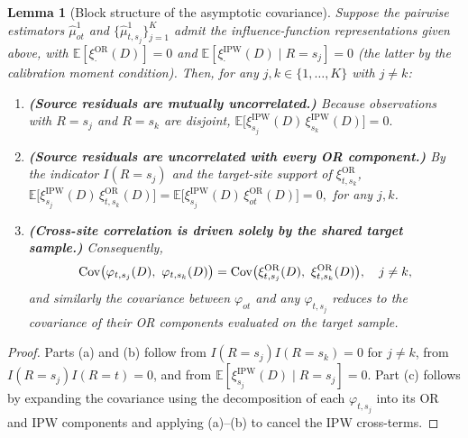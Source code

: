 \documentclass{article}
\newtheorem{lemma}[theorem]{Lemma}
\begin{document}
\begin{lemma}[Block structure of the asymptotic covariance]\label{lem:cov_block_structure}
Suppose the pairwise estimators $\widehat{\mu}^1_{ot}$ and $\{\widehat{\mu}^1_{t,s_j}\}_{j=1}^K$ admit the influence-function representations given above, with $\mathbb{E}[\xi^{\mathrm{OR}}_{\cdot}(D)]=0$ and $\mathbb{E}[\xi^{\mathrm{IPW}}_{\cdot}(D)\mid R=s_j]=0$ (the latter by the calibration moment condition). Then, for any $j,k\in\{1,\ldots,K\}$ with $j\ne k$:
\begin{enumerate}[label={(\alph*)},leftmargin=*]
\item \textbf{(Source residuals are mutually uncorrelated.)} Because observations with $R=s_j$ and $R=s_k$ are disjoint,
\(
\mathbb{E}\bigl[\xi^{\mathrm{IPW}}_{s_j}(D)\,\xi^{\mathrm{IPW}}_{s_k}(D)\bigr]=0.
\)

\item \textbf{(Source residuals are uncorrelated with every OR component.)} By the indicator $I(R=s_j)$ and the target-site support of $\xi^{\mathrm{OR}}_{t,s_k}$,
\(
\mathbb{E}\bigl[\xi^{\mathrm{IPW}}_{s_j}(D)\,\xi^{\mathrm{OR}}_{t,s_k}(D)\bigr]
=\mathbb{E}\bigl[\xi^{\mathrm{IPW}}_{s_j}(D)\,\xi^{\mathrm{OR}}_{ot}(D)\bigr]=0,
\)
for any $j,k$.

\item \textbf{(Cross-site correlation is driven solely by the shared target sample.)} Consequently,
\[
\Cov\bigl(\varphi_{t,s_j}(D),\ \varphi_{t,s_k}(D)\bigr)
=\Cov\bigl(\xi^{\mathrm{OR}}_{t,s_j}(D),\ \xi^{\mathrm{OR}}_{t,s_k}(D)\bigr),
\quad j\ne k,
\]
and similarly the covariance between $\varphi_{ot}$ and any $\varphi_{t,s_j}$ reduces to the covariance of their OR components evaluated on the target sample.
\end{enumerate}
\end{lemma}

\begin{proof}
Parts (a) and (b) follow from $I(R=s_j)I(R=s_k)=0$ for $j\ne k$, from $I(R=s_j)I(R=t)=0$, and from $\mathbb{E}[\xi^{\mathrm{IPW}}_{s_j}(D)\mid R=s_j]=0$. Part (c) follows by expanding the covariance using the decomposition of each $\varphi_{t,s_j}$ into its OR and IPW components and applying (a)--(b) to cancel the IPW cross-terms.
\end{proof}
\end{document}
